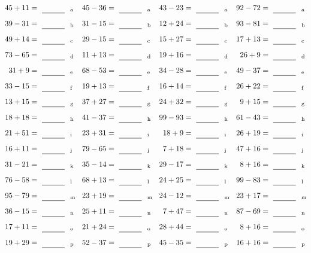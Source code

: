 \documentclass
[
  draft    = true,
  fontsize = 11pt,
  parskip  = half-
]
{scrartcl}
\begin{document}
\clearpage
\begin{align*}
    \pline{45+11}&=\rline{a}
  & \pline{45-36}&=\rline{a}
  & \pline{43-23}&=\rline{a}
  & \pline{92-72}&=\rline{a} \\[1ex]
    \pline{39-31}&=\rline{b}
  & \pline{31-15}&=\rline{b}
  & \pline{12+24}&=\rline{b}
  & \pline{93-81}&=\rline{b} \\[1ex]
    \pline{49+14}&=\rline{c}
  & \pline{29-15}&=\rline{c}
  & \pline{15+27}&=\rline{c}
  & \pline{17+13}&=\rline{c} \\[1ex]
    \pline{73-65}&=\rline{d}
  & \pline{11+13}&=\rline{d}
  & \pline{19+16}&=\rline{d}
  & \pline{26+9}&=\rline{d} \\[1ex]
    \pline{31+9}&=\rline{e}
  & \pline{68-53}&=\rline{e}
  & \pline{34-28}&=\rline{e}
  & \pline{49-37}&=\rline{e} \\[1ex]
    \pline{33-15}&=\rline{f}
  & \pline{19+13}&=\rline{f}
  & \pline{16+14}&=\rline{f}
  & \pline{26+22}&=\rline{f} \\[1ex]
    \pline{13+15}&=\rline{g}
  & \pline{37+27}&=\rline{g}
  & \pline{24+32}&=\rline{g}
  & \pline{9+15}&=\rline{g} \\[1ex]
    \pline{18+18}&=\rline{h}
  & \pline{41-37}&=\rline{h}
  & \pline{99-93}&=\rline{h}
  & \pline{61-43}&=\rline{h} \\[1ex]
    \pline{21+51}&=\rline{i}
  & \pline{23+31}&=\rline{i}
  & \pline{18+9}&=\rline{i}
  & \pline{26+19}&=\rline{i} \\[1ex]
    \pline{16+11}&=\rline{j}
  & \pline{79-65}&=\rline{j}
  & \pline{7+18}&=\rline{j}
  & \pline{47+16}&=\rline{j} \\[1ex]
    \pline{31-21}&=\rline{k}
  & \pline{35-14}&=\rline{k}
  & \pline{29-17}&=\rline{k}
  & \pline{8+16}&=\rline{k} \\[1ex]
    \pline{76-58}&=\rline{l}
  & \pline{68+13}&=\rline{l}
  & \pline{24+25}&=\rline{l}
  & \pline{99-83}&=\rline{l} \\[1ex]
    \pline{95-79}&=\rline{m}
  & \pline{23+19}&=\rline{m}
  & \pline{24-12}&=\rline{m}
  & \pline{23+17}&=\rline{m} \\[1ex]
    \pline{36-15}&=\rline{n}
  & \pline{25+11}&=\rline{n}
  & \pline{7+47}&=\rline{n}
  & \pline{87-69}&=\rline{n} \\[1ex]
    \pline{17+11}&=\rline{o}
  & \pline{21+24}&=\rline{o}
  & \pline{28+44}&=\rline{o}
  & \pline{8+16}&=\rline{o} \\[1ex]
    \pline{19+29}&=\rline{p}
  & \pline{52-37}&=\rline{p}
  & \pline{45-35}&=\rline{p}
  & \pline{16+16}&=\rline{p}
\end{align*}
\end{document}
